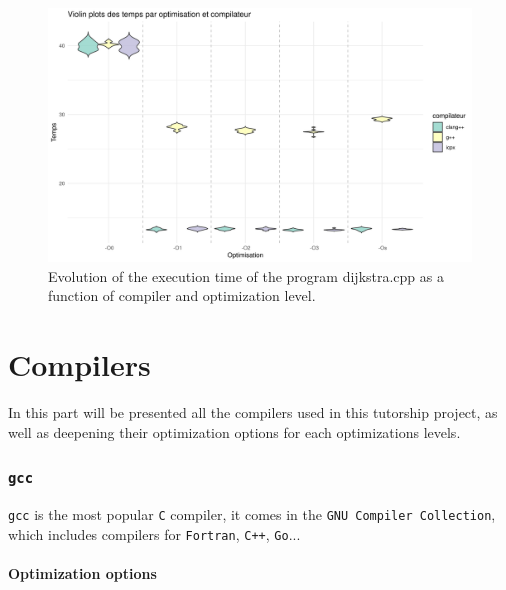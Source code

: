 \documentclass{rapport}
\newcommand{\gcc}{\texttt{gcc} }
\begin{document}
\begin{figure}[H]
\centering
\includegraphics[width=1\textwidth]{img/plots/violin_plot_dijkstra.png}
\caption{Evolution of the execution time of the program dijkstra.cpp as a function of compiler and optimization level.}
\label{fig:image2}
\end{figure}


\clearpage
\part{Compilers}
In this part will be presented all the compilers used in this tutorship project, as well as deepening their optimization options for each optimizations levels.
\section{\gcc}
\gcc is the most popular \texttt{C} compiler, it comes in the \texttt{GNU Compiler Collection}, which includes compilers for \texttt{Fortran}, \texttt{C++}, \texttt{Go}...
\subsection{Optimization options}
\end{document}

